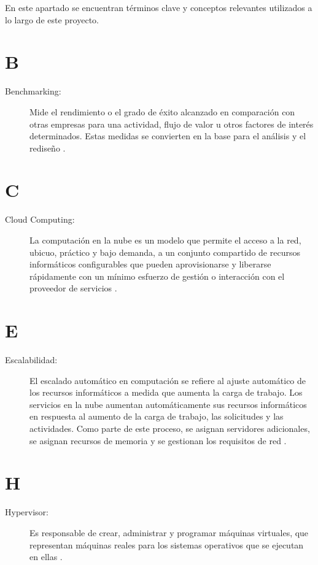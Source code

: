 \label{cap:glosario}

En este apartado se encuentran términos clave y conceptos relevantes utilizados a lo largo de este proyecto.

\section*{B}
\begin{description}
  \item[Benchmarking:] Mide el rendimiento o el grado de éxito alcanzado en comparación con otras empresas para una actividad, flujo de valor u otros factores de interés determinados. Estas medidas se convierten en la base para el análisis y el rediseño \citep{PeterWootton2024}.
\end{description}

\section*{C}
\begin{description}
  \item[Cloud Computing:] La computación en la nube es un modelo que permite el acceso a la red, ubicuo, práctico y bajo demanda, a un conjunto compartido de recursos informáticos configurables que pueden aprovisionarse y liberarse rápidamente con un mínimo esfuerzo de gestión o interacción con el proveedor de servicios \citep{Mell2011}.
\end{description}

\section*{E}
\begin{description}
  \item[Escalabilidad:] El escalado automático en computación se refiere al ajuste automático de los recursos informáticos a medida que aumenta la carga de trabajo. Los servicios en la nube aumentan automáticamente sus recursos informáticos en respuesta al aumento de la carga de trabajo, las solicitudes y las actividades. Como parte de este proceso, se asignan servidores adicionales, se asignan recursos de memoria y se gestionan los requisitos de red \citep{TARI2024100650}.
\end{description}

\section*{H}
\begin{description}
  \item[Hypervisor:] Es responsable de crear, administrar y programar máquinas virtuales, que representan máquinas reales para los sistemas operativos que se ejecutan en ellas \citep{Cinque2024}.
\end{description}

